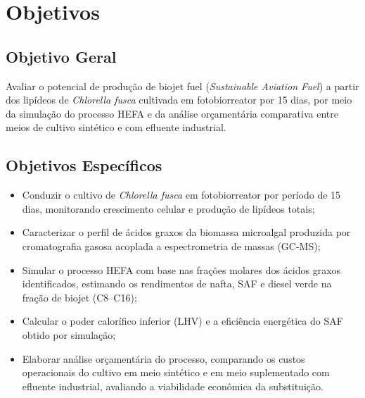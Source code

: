 
\section{Objetivos}

\subsection{Objetivo Geral}

Avaliar o potencial de produção de biojet fuel (\textit{Sustainable Aviation
Fuel}) a partir dos lipídeos de \textit{Chlorella fusca} cultivada em
fotobiorreator por 15 dias, por meio da simulação do processo HEFA e da
análise orçamentária comparativa entre meios de cultivo sintético e com
efluente industrial.

\subsection{Objetivos Específicos}

\begin{itemize}
    \item Conduzir o cultivo de \textit{Chlorella fusca} em fotobiorreator
          por período de 15 dias, monitorando crescimento celular e
          produção de lipídeos totais;

    \item Caracterizar o perfil de ácidos graxos da biomassa microalgal
          produzida por cromatografia gasosa acoplada a espectrometria de
          massas (GC-MS);

    \item Simular o processo HEFA com base nas frações molares dos ácidos
          graxos identificados, estimando os rendimentos de nafta, SAF e
          diesel verde na fração de biojet (C8--C16);

    \item Calcular o poder calorífico inferior (LHV) e a eficiência
          energética do SAF obtido por simulação;

    \item Elaborar análise orçamentária do processo, comparando os custos
          operacionais do cultivo em meio sintético e em meio suplementado
          com efluente industrial, avaliando a viabilidade econômica da
          substituição.
\end{itemize}
